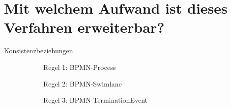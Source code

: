 \section{Mit welchem Aufwand ist dieses Verfahren erweiterbar?}

\begin{frame}{Konsistenzbeziehungen}
  \begin{figure}
    \centering
    \begin{subfigure}{0.3\textwidth}
      \centering
      \begin{adjustbox}{width=0.8\linewidth,center}
      \end{adjustbox}
      \caption*{\tiny{\textcolor{black!20}{Regel 1: BPMN-Process}}}%
    \end{subfigure}
    \hfill
    \begin{subfigure}{0.3\textwidth}
      \centering
      \begin{adjustbox}{width=0.8\linewidth,center}
      \end{adjustbox}
      \caption*{\tiny{\textcolor{black!20}{Regel 2: BPMN-Swimlane}}}%
    \end{subfigure}
    \hfill
    \begin{subfigure}{0.3\textwidth}
      \centering
      \begin{adjustbox}{width=0.8\linewidth,center}
      \end{adjustbox}
      \caption*{\tiny{\textcolor{black!20}{Regel 3: BPMN-TerminationEvent}}}%
    \end{subfigure}
    \begin{subfigure}{0.3\textwidth}
      \vspace{4pt}

\end{subfigure}
\end{figure}
\end{frame}
